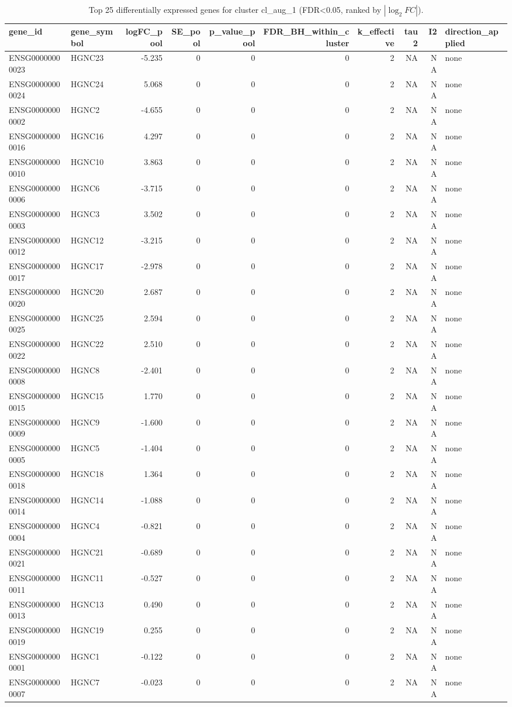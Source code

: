 \begin{table}

\caption{\label{tab:tab:top-genes-cl-aug-1}Top 25 differentially expressed genes for cluster cl_aug_1 (FDR<0.05, ranked by $|\log_2 FC|$).}
\centering
\begin{tabular}[t]{llrrrrrrrl}
\toprule
gene\_id & gene\_symbol & logFC\_pool & SE\_pool & p\_value\_pool & FDR\_BH\_within\_cluster & k\_effective & tau2 & I2 & direction\_applied\\
\midrule
ENSG00000000023 & HGNC23 & -5.235 & 0 & 0 & 0 & 2 & NA & NA & none\\
ENSG00000000024 & HGNC24 & 5.068 & 0 & 0 & 0 & 2 & NA & NA & none\\
ENSG00000000002 & HGNC2 & -4.655 & 0 & 0 & 0 & 2 & NA & NA & none\\
ENSG00000000016 & HGNC16 & 4.297 & 0 & 0 & 0 & 2 & NA & NA & none\\
ENSG00000000010 & HGNC10 & 3.863 & 0 & 0 & 0 & 2 & NA & NA & none\\
\addlinespace
ENSG00000000006 & HGNC6 & -3.715 & 0 & 0 & 0 & 2 & NA & NA & none\\
ENSG00000000003 & HGNC3 & 3.502 & 0 & 0 & 0 & 2 & NA & NA & none\\
ENSG00000000012 & HGNC12 & -3.215 & 0 & 0 & 0 & 2 & NA & NA & none\\
ENSG00000000017 & HGNC17 & -2.978 & 0 & 0 & 0 & 2 & NA & NA & none\\
ENSG00000000020 & HGNC20 & 2.687 & 0 & 0 & 0 & 2 & NA & NA & none\\
\addlinespace
ENSG00000000025 & HGNC25 & 2.594 & 0 & 0 & 0 & 2 & NA & NA & none\\
ENSG00000000022 & HGNC22 & 2.510 & 0 & 0 & 0 & 2 & NA & NA & none\\
ENSG00000000008 & HGNC8 & -2.401 & 0 & 0 & 0 & 2 & NA & NA & none\\
ENSG00000000015 & HGNC15 & 1.770 & 0 & 0 & 0 & 2 & NA & NA & none\\
ENSG00000000009 & HGNC9 & -1.600 & 0 & 0 & 0 & 2 & NA & NA & none\\
\addlinespace
ENSG00000000005 & HGNC5 & -1.404 & 0 & 0 & 0 & 2 & NA & NA & none\\
ENSG00000000018 & HGNC18 & 1.364 & 0 & 0 & 0 & 2 & NA & NA & none\\
ENSG00000000014 & HGNC14 & -1.088 & 0 & 0 & 0 & 2 & NA & NA & none\\
ENSG00000000004 & HGNC4 & -0.821 & 0 & 0 & 0 & 2 & NA & NA & none\\
ENSG00000000021 & HGNC21 & -0.689 & 0 & 0 & 0 & 2 & NA & NA & none\\
\addlinespace
ENSG00000000011 & HGNC11 & -0.527 & 0 & 0 & 0 & 2 & NA & NA & none\\
ENSG00000000013 & HGNC13 & 0.490 & 0 & 0 & 0 & 2 & NA & NA & none\\
ENSG00000000019 & HGNC19 & 0.255 & 0 & 0 & 0 & 2 & NA & NA & none\\
ENSG00000000001 & HGNC1 & -0.122 & 0 & 0 & 0 & 2 & NA & NA & none\\
ENSG00000000007 & HGNC7 & -0.023 & 0 & 0 & 0 & 2 & NA & NA & none\\
\bottomrule
\end{tabular}
\end{table}
